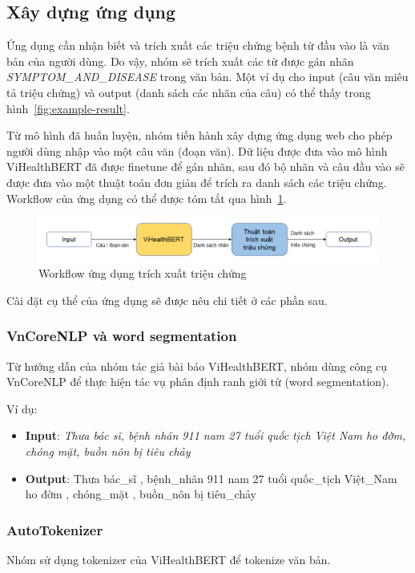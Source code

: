 \subsection{Xây dựng ứng dụng}
Ứng dụng cần nhận biết và trích xuất các triệu chứng bệnh từ đầu vào là văn bản của người dùng. Do vậy, nhóm sẽ trích xuất các từ được gán nhãn \textit{SYMPTOM\_AND\_DISEASE} trong văn bản. Một ví dụ cho input (câu văn miêu tả triệu chứng) và output (danh sách các nhãn của câu) có thể thấy trong hình~\ref{fig:example-result}.

Từ mô hình đã huấn luyện, nhóm tiến hành xây dựng ứng dụng web cho phép người dùng nhập vào một câu văn (đoạn văn). Dữ liệu được đưa vào mô hình ViHealthBERT đã được finetune để gán nhãn, sau đó bộ nhãn và câu đầu vào sẽ được đưa vào một thuật toán đơn giản để trích ra danh sách các triệu chứng. Workflow của ứng dụng có thể được tóm tắt qua hình~\ref{fig:workflow}.
\begin{figure}
\centering
\includegraphics[scale=.6]{img/workflow.png}
\caption{Workflow ứng dụng trích xuất triệu chứng}
\label{fig:workflow}
\end{figure}
Cài đặt cụ thể của ứng dụng sẽ được nêu chi tiết ở các phần sau.

\subsubsection{VnCoreNLP và word segmentation}
Từ hướng dẫn của nhóm tác giả bài báo ViHealthBERT, nhóm dùng công cụ VnCoreNLP để thực hiện tác vụ phân định ranh giới từ (word segmentation).

\lstset{style=mystyle}

Ví dụ:
\begin{itemize}
\item \textbf{Input}: \textit{Thưa bác sĩ, bệnh nhân 911 nam 27 tuổi quốc tịch Việt Nam ho đờm, chóng mặt, buồn nôn bị tiêu chảy}
\item \textbf{Output}: Thưa bác\_sĩ , bệnh\_nhân 911 nam 27 tuổi quốc\_tịch Việt\_Nam ho đờm , chóng\_mặt , buồn\_nôn bị tiêu\_chảy
\end{itemize}

\subsubsection{AutoTokenizer}
Nhóm sử dụng tokenizer của ViHealthBERT để tokenize văn bản.
\lstset{style=mystyle}


